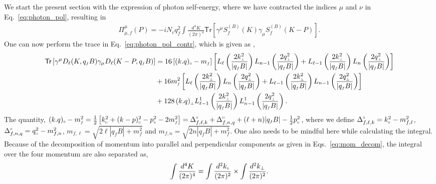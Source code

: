 \documentclass[aps,prd,floatfix,showpacs,showkeys,superscriptadress,unsortedaddress,nofootinbib,onecolumn]{revtex4-1}
\newcommand{\sF}{\scriptscriptstyle{f}}
\newcommand{\sB}{\scriptscriptstyle{(B)}}
\newcommand{\sperp}{\scriptscriptstyle{\perp}}
\newcommand{\shp}{\shortparallel}
\newcommand{\nn}{\nonumber \\}
\begin{document}
We start the present section with the expression of photon self-energy, where we have contracted the indices $\mu$ and $\nu$ in Eq.~\eqref{eq:photon_pol}, resulting in 
\begin{align}
\Pi^\mu_{\mu,\sF}(P) = -iN_cq_{\sF}^2\int\!\!\frac{d^4K}{(2\pi)^4}\mathsf{Tr}\left[\gamma^{\mu}S^{\sB}_{\sF}(K)\gamma_{\mu}S^{\sB}_{\sF}(K-P)\right].
\label{eq:photon_pol_contr}
\end{align} 
One can now perform the trace in Eq.~\eqref{eq:photon_pol_contr}, which is given as ,
\begin{align}
\textsf{Tr}\left[\gamma^{\mu}D_{\ell}(K,q_{\sF}B)\gamma_{\mu}D_{\ell}(K-P,q_{\sF}B)\right] &= 16\left[(k.q)_{\shp}-m_{\sF}\right]
\left[L_{\ell}\left(\frac{2k_{\sperp}^2}{|q_{\sF}B|}\right)L_{n-1}\left(\frac{2q_{\sperp}^2}{|q_{\sF}B|}\right) + L_{\ell-1}\left(\frac{2k_{\sperp}^2}{|q_{\sF}B|}\right)L_{n}\left(\frac{2q_{\sperp}^2}{|q_{\sF}B|}\right)\right]\nn
&+16m_{\sF}^2\left[L_{\ell}\left(\frac{2k_{\sperp}^2}{|q_{\sF}B|}\right)L_{n}\left(\frac{2q_{\sperp}^2}{|q_{\sF}B|}\right) + L_{\ell-1}\left(\frac{2k_{\sperp}^2}{|q_{\sF}B|}\right)L_{n-1}\left(\frac{2q_{\sperp}^2}{|q_{\sF}B|}\right)\right] \nn
&+128\,(k.q)_{\sperp}L_{\ell-1}^1\left(\frac{2k_{\sperp}^2}{|q_{\sF}B|}\right)L_{n-1}^1\left(\frac{2q_{\sperp}^2}{|q_{\sF}B|}\right).
\end{align}
The quantity, $(k.q)_{\shp}-m_{\sF}^2 =\frac{1}{2}\left[k^2_{\shp}+(k-p)_{\shp}^2-p^2_{\shp}-2m_{\sF}^2\right] =\Delta_{f,\ell,k}^{\shp}+\Delta_{f,n,q}^{\shp}+(\ell+n)|q_{\sF}B|-\frac{1}{2}p_{\shp}^2$,
where we define $\Delta_{f,\ell,k}^{\shp} = k_{\shp}^2-m_{f,\ell}^2$, $\Delta_{f,n,q}^{\shp} = q_{\shp}^2-m_{f,n}^2$, $m_{f,\ell}=\sqrt{2\ell |q_{\sF}B|+m_{\sF}^2}$ and $m_{f,n}=\sqrt{2n|q_{\sF}B|+m_{\sF}^2}$. One also needs to be mindful here while calculating the integral. Because of the decomposition of momentum into parallel and perpendicular components as given in Eqs.~\ref{eq:mom_decom}, the integral over the four momentum are also separated as,
\begin{align}
\int\frac{d^4K}{(2\pi)^4} = \int\frac{d^2k_\shortparallel}{(2\pi)^2}\times \int\frac{d^2k_\perp}{(2\pi)^2}.
\end{align}
\end{document}
